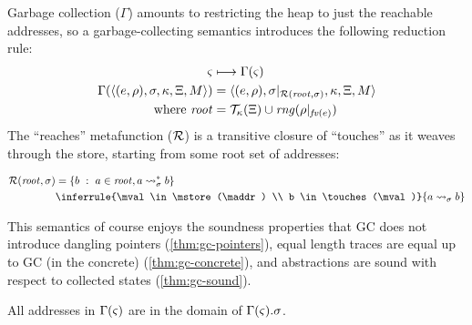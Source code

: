 \begin{SCodeFlow}
\begin{RktBlk}
\begin{SingleColumn}
\mbox{}\RktPn{(}\mbox{}\RktPn{(}\RktPn{[}\RktSym{$\mkont$}\mbox{}\RktPn{(}\mbox{}\RktPn{(}\mbox{}\RktSym{$\mktab$}\mbox{}\RktPn{)}\RktPn{)}\RktPn{]}\RktPn{)}

\mbox{}\RktPn{(}\mbox{}\RktSym{$\mkont$}\RktPn{)}\RktPn{)}\RktPn{]}\RktPn{)}\RktPn{]}\RktPn{)}\RktPn{)}\RktPn{)}\end{SingleColumn}\end{RktBlk}\end{SCodeFlow}

Garbage collection ($\Gamma$) amounts to restricting the heap to just the reachable addresses, so a garbage-collecting semantics introduces the following reduction rule:
\begin{align*}
  \varsigma &\longmapsto \Gamma(\varsigma) \\
  \Gamma(\langle (e,\rho),\sigma,\kappa, \Xi, M \rangle) &= \langle (e,\rho),\sigma|_{{\mathcal R}(\mathit{root}, \sigma)}, \kappa, \Xi, M \rangle \\
  \text{where } \mathit{root} &= {\mathcal T}_{\kappa}(\Xi) \cup \mathit{rng}(\rho|_{\mathit{fv}(e)})
\end{align*}
%
The ``reaches'' metafunction (${\mathcal R}$) is a transitive closure of ``touches'' as it weaves through the store, starting from some root set of addresses:

\begin{align*}
  \reaches(\mathit{root}, \mstore) &= \setbuild{b}{\maddr \in \mathit{root}, \maddr \rightsquigarrow_\mstore^* b} \\
   &
               \inferrule{\mval \in \mstore(\maddr) \\
                             b \in \touches(\mval)}
                            {\maddr \rightsquigarrow_\mstore b}
\end{align*}

This semantics of course enjoys the soundness properties that GC does not introduce dangling pointers (\autoref{thm:gc-pointers}), equal length traces are equal up to GC (in the concrete) (\autoref{thm:gc-concrete}), and abstractions are sound with respect to collected states (\autoref{thm:gc-sound}).
%
\begin{theorem}\label{thm:gc-pointers}
  All addresses in $\Gamma(\varsigma)$ are in the domain of $\Gamma(\varsigma).\sigma$.
\end{theorem}

